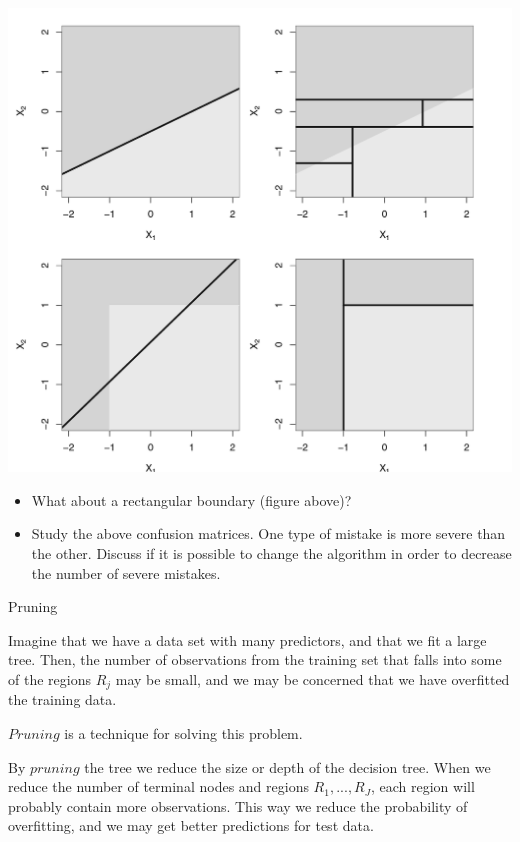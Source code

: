 \documentclass[ignorenonframetext,]{beamer}
\providecommand{\tightlist}{%
  \setlength{\itemsep}{0pt}\setlength{\parskip}{0pt}}
\begin{document}
\begin{frame}

\includegraphics{Introtostatlearn-326.png}

\end{frame}

\begin{frame}

\begin{itemize}
\tightlist
\item
  What about a rectangular boundary (figure above)?
\item
  Study the above confusion matrices. One type of mistake is more severe
  than the other. Discuss if it is possible to change the algorithm in
  order to decrease the number of severe mistakes.
\end{itemize}

\end{frame}

\begin{frame}{Pruning}

Imagine that we have a data set with many predictors, and that we fit a
large tree. Then, the number of observations from the training set that
falls into some of the regions \(R_j\) may be small, and we may be
concerned that we have overfitted the training data.

\(Pruning\) is a technique for solving this problem.

By \(pruning\) the tree we reduce the size or depth of the decision
tree. When we reduce the number of terminal nodes and regions
\(R_1,...,R_J\), each region will probably contain more observations.
This way we reduce the probability of overfitting, and we may get better
predictions for test data.

\end{frame}
\end{document}
